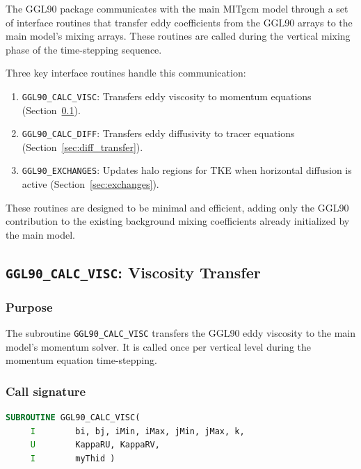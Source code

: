 \documentclass[12pt,letterpaper]{article}
\begin{document}
The GGL90 package communicates with the main MITgcm model through a set of interface routines that transfer eddy coefficients from the GGL90 arrays to the main model's mixing arrays. These routines are called during the vertical mixing phase of the time-stepping sequence.

Three key interface routines handle this communication:
\begin{enumerate}
\item \verb|GGL90_CALC_VISC|: Transfers eddy viscosity to momentum equations (Section~\ref{sec:visc_transfer}).
\item \verb|GGL90_CALC_DIFF|: Transfers eddy diffusivity to tracer equations (Section~\ref{sec:diff_transfer}).
\item \verb|GGL90_EXCHANGES|: Updates halo regions for TKE when horizontal diffusion is active (Section~\ref{sec:exchanges}).
\end{enumerate}

These routines are designed to be minimal and efficient, adding only the GGL90 contribution to the existing background mixing coefficients already initialized by the main model.

\subsection{\texttt{GGL90\_CALC\_VISC}: Viscosity Transfer}
\label{sec:visc_transfer}

\subsubsection{Purpose}

The subroutine \verb|GGL90_CALC_VISC| transfers the GGL90 eddy viscosity to the main model's momentum solver. It is called once per vertical level during the momentum equation time-stepping.

\subsubsection{Call signature}

\begin{lstlisting}[language=Fortran,caption={(ggl90\_calc\_visc.F:L7--10) Subroutine interface}]
      SUBROUTINE GGL90_CALC_VISC(
     I        bi, bj, iMin, iMax, jMin, jMax, k,
     U        KappaRU, KappaRV,
     I        myThid )
\end{lstlisting}
\end{document}
